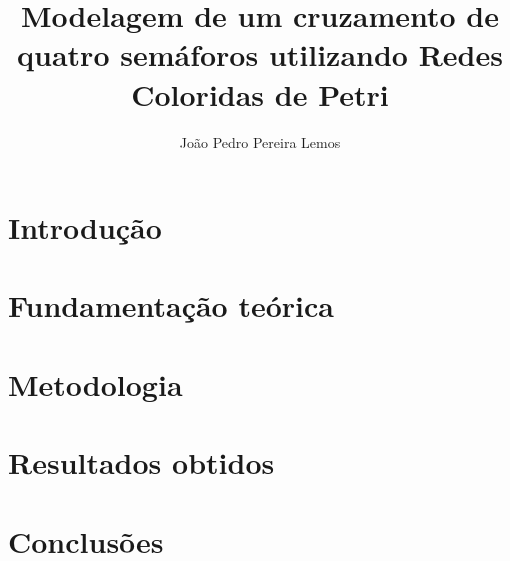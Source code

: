 \documentclass[12pt]{article}
\title{Modelagem de um cruzamento de quatro semáforos utilizando Redes Coloridas de Petri}
\author{João Pedro Pereira Lemos\inst{1}}
\begin{document}
 

\maketitle

\begin{abstract}
  
\end{abstract}
     
\begin{resumo}
  
\end{resumo}


\section{Introdução}




\section{Fundamentação teórica}




\section{Metodologia}




\section{Resultados obtidos}




\section{Conclusões}






\end{document}

